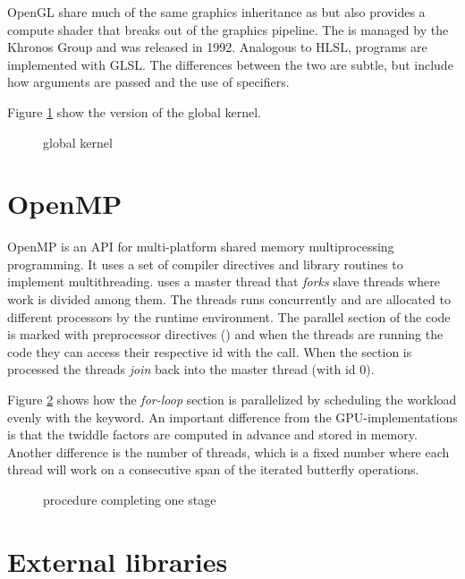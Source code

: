 \gls{OpenGL} share much of the same graphics inheritance as {\DX} but also provides a compute shader that breaks out of the graphics pipeline. The {\GL} is managed by the Khronos Group and was released in 1992. Analogous to \gls{HLSL}, {\GL} programs are implemented with \gls{GLSL}. The differences between the two are subtle, but include how arguments are passed and the use of specifiers.

Figure \ref{lst:sample:global:gl} show the {\GL} version of the global kernel.

\begin{figure}
	\centering
	\fbox{}
	\caption{{\GL} global kernel}
	\label{lst:sample:global:gl}	
\end{figure}

\section{OpenMP}

\gls{OpenMP} is an \gls{API} for multi-platform shared memory multiprocessing programming. It uses a set of compiler directives and library routines to implement multithreading. {\OMP} uses a master thread that \emph{forks} slave threads where work is divided among them. The threads runs concurrently and are allocated to different processors by the runtime environment. The parallel section of the code is marked with preprocessor directives () and when the threads are running the code they can access their respective id with the  call. When the section is processed the threads \emph{join} back into the master thread (with id $0$).

Figure \ref{lst:sample:global:omp} shows how the \emph{for-loop} section is parallelized by scheduling the workload evenly with the  keyword. An important difference from the GPU-implementations is that the twiddle factors are computed in advance and stored in memory. Another difference is the number of threads, which is a fixed number where each thread will work on a consecutive span of the iterated butterfly operations.

\begin{figure}
	\centering
	\fbox{}%
	\caption{{\OMP} procedure completing one stage}%
	\label{lst:sample:global:omp}%
\end{figure}%

\section{External libraries}

